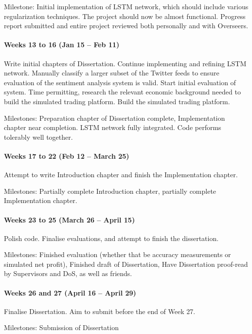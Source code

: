 \documentclass[12pt,a4paper,twoside,openright]{report}
\begin{document}
Milestone: Initial implementation of LSTM network, which should include various
regularization techniques. The project should now be almost functional. Progress report
submitted and entire project reviewed both personally and with Overseers.

\paragraph{Weeks 13 to 16 (Jan 15 – Feb 11)}
Write initial chapters of Dissertation. Continue implementing and refining LSTM network.
Manually classify a larger subset of the Twitter feeds to ensure evaluation of the sentiment
analysis system is valid. Start initial evaluation of system. Time permitting, research the relevant 
economic background needed to build the simulated trading platform. Build the simulated
trading platform.

Milestones: Preparation chapter of Dissertation complete, Implementation chapter near
completion. LSTM network fully integrated. Code performs tolerably well together. 


\paragraph{Weeks 17 to 22 (Feb 12 – March 25)}
Attempt to write Introduction chapter and finish the Implementation chapter.

Milestones: Partially complete Introduction chapter, partially complete Implementation chapter.


\paragraph{Weeks 23 to 25 (March 26 – April 15)}
Polish code. Finalise evaluations, and attempt to finish the dissertation.

Milestones: Finished evaluation (whether that be accuracy measurements or simulated net
profit), Finished draft of Dissertation, Have Dissertation proof-read by Supervisors and DoS, as
well as friends.

\paragraph{Weeks 26 and 27 (April 16 – April 29)}
Finalise Dissertation. Aim to submit before the end of Week 27.

Milestones: Submission of Dissertation
\end{document}
